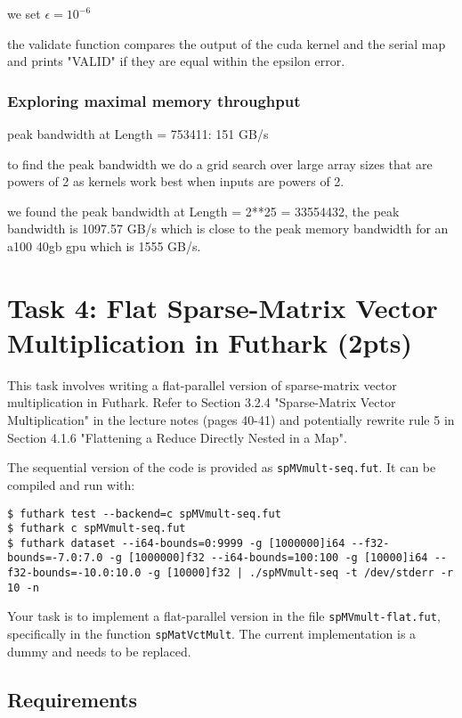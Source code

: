 \documentclass{article}
\begin{document}
we set $\epsilon = 10^{-6}$

the validate function compares the output of the cuda kernel and the serial map and prints "VALID" if they are equal within the epsilon error.

\subsubsection*{Exploring maximal memory throughput}

peak bandwidth at Length = 753411: 151 GB/s

to find the peak bandwidth we do a grid search over large array sizes that are powers of 2 as kernels work best when inputs are powers of 2.

we found the peak bandwidth at Length = 2**25 = 33554432, the peak bandwidth is 1097.57 GB/s which is close to the peak memory bandwidth for an a100 40gb gpu which is 1555 GB/s.


\section{Task 4: Flat Sparse-Matrix Vector Multiplication in Futhark (2pts)}

This task involves writing a flat-parallel version of sparse-matrix vector multiplication in Futhark. Refer to Section 3.2.4 "Sparse-Matrix Vector Multiplication" in the lecture notes (pages 40-41) and potentially rewrite rule 5 in Section 4.1.6 "Flattening a Reduce Directly Nested in a Map".

The sequential version of the code is provided as \texttt{spMVmult-seq.fut}. It can be compiled and run with:

\begin{verbatim}
$ futhark test --backend=c spMVmult-seq.fut
$ futhark c spMVmult-seq.fut
$ futhark dataset --i64-bounds=0:9999 -g [1000000]i64 --f32-bounds=-7.0:7.0 -g [1000000]f32 --i64-bounds=100:100 -g [10000]i64 --f32-bounds=-10.0:10.0 -g [10000]f32 | ./spMVmult-seq -t /dev/stderr -r 10 -n
\end{verbatim}

Your task is to implement a flat-parallel version in the file \texttt{spMVmult-flat.fut}, specifically in the function \texttt{spMatVctMult}. The current implementation is a dummy and needs to be replaced.

\subsection{Requirements}
\end{document}
